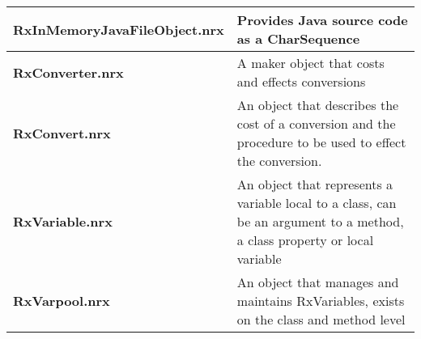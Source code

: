 \begin{table}
\begin{tabularx}{\textwidth}{>{\bfseries}lX}
    \\\midrule
    RxInMemoryJavaFileObject.nrx    &Provides Java source code as a CharSequence
    \\\midrule
    RxConverter.nrx     &A maker object that costs and effects conversions
    \\\midrule
    RxConvert.nrx       &An object that describes the cost of a conversion and the procedure
    to be used to effect the conversion.
    \\\midrule
    RxVariable.nrx      &An object that represents a variable local to a class, can be an
    argument to a method, a class property or local variable
    \\\midrule
    RxVarpool.nrx       &An object that manages and maintains RxVariables, exists on
    the class and method level
    \\\bottomrule
\end{tabularx}
\end{table}

